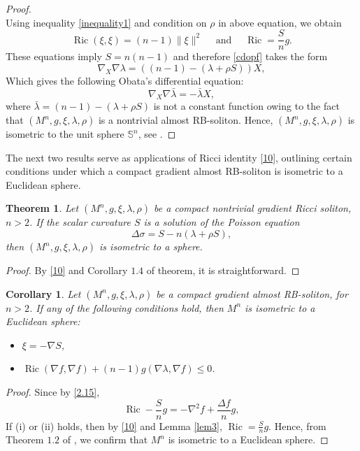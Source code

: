 \documentclass[a4paper, twoside, 10pt]{article}
\numberwithin{equation}{section}
\newtheorem{theorem}{Theorem}[section]
\newtheorem{corollary}{Corollary}[section]
\theoremstyle{definition}
\begin{document}
\begin{proof}
\[\]
Using inequality \eqref{inequality1} and condition on $\rho$ in above equation, we obtain
\[
\operatorname{Ric}(\xi, \xi)=(n-1)\|\xi\|^{2} \quad \text { and } \quad \operatorname{Ric}=\frac{S}{n} g.
\]
These equations imply $S=n(n-1)$ and therefore  \eqref{cdopf} takes the form
\[
\nabla_{X} \nabla \lambda=((n-1)-(\lambda+\rho S)) X,
\]
Which gives the following Obata's differential equation:
\[
\nabla_{X} \nabla \bar{\lambda}=-\bar{\lambda} X,
\]
where $\bar{\lambda}=(n-1)-(\lambda+\rho S)$ is not a constant function owing to the fact that $(M^n, g, \xi, \lambda,\rho)$ is a nontrivial almost RB-soliton. Hence, $(M^n, g, \xi, \lambda,\rho)$ is isometric to the unit sphere $\mathbb{S}^{n}$, see \cite{obata}.
 \end{proof}
 
The next two results serve as applications of Ricci identity \eqref{10}, outlining certain conditions under which a compact gradient almost RB-soliton is isometric to a Euclidean sphere. 
 \begin{theorem}
Let $(M^n,g,\xi,\lambda,\rho)$ be a compact nontrivial gradient Ricci soliton, $n>2$. If the scalar curvature $S$ is a solution of the Poisson equation $$\Delta\sigma=S-n(\lambda+\rho S),$$ then $(M^n,g,\xi,\lambda,\rho)$ is isometric to a sphere. 
 \end{theorem}
 \begin{proof}
 By \eqref{10} and Corollary $1.4$ of \cite{SDRBS} theorem, it is straightforward.
\end{proof}
 \begin{corollary}
Let $(M^n,g,\xi,\lambda,\rho )$ be a compact gradient almost RB-soliton, for $n>2$. If any of the following conditions hold, then $M^n$ is isometric to a Euclidean sphere:
     \begin{itemize}
         \item[(i)] $\xi= -\nabla S $,
         \item[(ii)] $\operatorname{Ric}(\nabla f,\nabla f)+(n-1)g(\nabla \lambda,\nabla f)\leq 0$.
     \end{itemize}
 \end{corollary}
 \begin{proof}
Since by \eqref{2.15},
\[
\operatorname{Ric} - \frac{S}{n}g=-\nabla^2 f + \frac{\Delta f}{n}g,
\]
If (i) or (ii) holds, then by \eqref{10} and Lemma \ref{lem3},  $\operatorname{Ric}=\frac{S}{n}g$.   Hence, from Theorem $1.2$ of \cite{SDRBS}, we confirm that $M^n$ is isometric to a Euclidean sphere.
 \end{proof}
\end{document}
